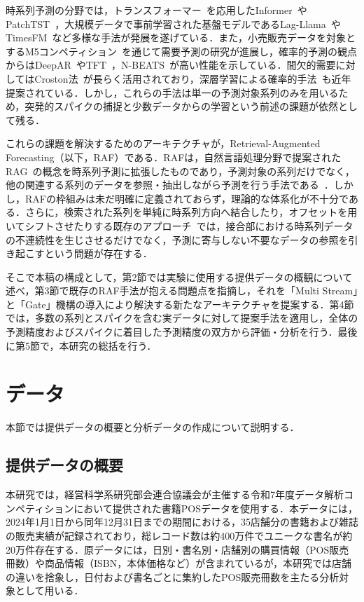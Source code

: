 \documentclass[twocolumn, lastpage]{jarticle}
\begin{document}
時系列予測の分野では，トランスフォーマー~\cite{Vaswani.2017}を応用したInformer~\cite{Zhou.2021}やPatchTST~\cite{Nie.2023}，大規模データで事前学習された基盤モデルであるLag-Llama~\cite{Rasul.2023}やTimesFM~\cite{Das.2024}など多様な手法が発展を遂げている．また，小売販売データを対象とするM5コンペティション~\cite{Makridakis.2022}を通じて需要予測の研究が進展し，確率的予測の観点からはDeepAR~\cite{Salinas.2020}やTFT~\cite{Lim.2021}，N-BEATS~\cite{Oreshkin.2020}が高い性能を示している．間欠的需要に対してはCroston法~\cite{Croston.1972}が長らく活用されており，深層学習による確率的手法~\cite{Turkmen.2021}も近年提案されている．しかし，これらの手法は単一の予測対象系列のみを用いるため，突発的スパイクの捕捉と少数データからの学習という前述の課題が依然として残る．

これらの課題を解決するためのアーキテクチャが，Retrieval-Augmented Forecasting（以下，RAF）である．RAFは，自然言語処理分野で提案されたRAG~\cite{Lewis.2020}の概念を時系列予測に拡張したものであり，予測対象の系列だけでなく，他の関連する系列のデータを参照・抽出しながら予測を行う手法である~\cite{Tire.2024, Ning.2025, Zhang.2024}．しかし，RAFの枠組みは未だ明確に定義されておらず，理論的な体系化が不十分である．さらに，検索された系列を単純に時系列方向へ結合したり，オフセットを用いてシフトさせたりする既存のアプローチ~\cite{Tire.2024}では，接合部における時系列データの不連続性を生じさせるだけでなく，予測に寄与しない不要なデータの参照を引き起こすという問題が存在する．

そこで本稿の構成として，第2節では実験に使用する提供データの概観について述べ，第3節で既存のRAF手法が抱える問題点を指摘し，それを「Multi Stream」と「Gate」機構の導入により解決する新たなアーキテクチャを提案する．第4節では，多数の系列とスパイクを含む実データに対して提案手法を適用し，全体の予測精度およびスパイクに着目した予測精度の双方から評価・分析を行う．最後に第5節で，本研究の総括を行う．





\section{データ}
本節では提供データの概要と分析データの作成について説明する．


\subsection{提供データの概要}
本研究では，経営科学系研究部会連合協議会が主催する令和7年度データ解析コンペティションにおいて提供された書籍POSデータを使用する．本データには，2024年1月1日から同年12月31日までの期間における，35店舗分の書籍および雑誌の販売実績が記録されており，総レコード数は約400万件でユニークな書名が約20万件存在する．原データには，日別・書名別・店舗別の購買情報（POS販売冊数）や商品情報（ISBN，本体価格など）が含まれているが，本研究では店舗の違いを捨象し，日付および書名ごとに集約したPOS販売冊数を主たる分析対象として用いる．
\end{document}
